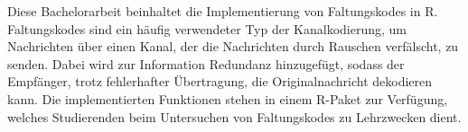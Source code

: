 Diese Bachelorarbeit beinhaltet die Implementierung von Faltungskodes in R. Faltungskodes sind ein häufig verwendeter Typ der Kanalkodierung, um Nachrichten über einen Kanal, der die Nachrichten durch Rauschen verfälscht, zu senden. Dabei wird zur Information Redundanz hinzugefügt, sodass der Empfänger, trotz fehlerhafter Übertragung, die Originalnachricht dekodieren kann. Die implementierten Funktionen stehen in einem R-Paket zur Verfügung, welches Studierenden beim Untersuchen von Faltungskodes zu Lehrzwecken dient.